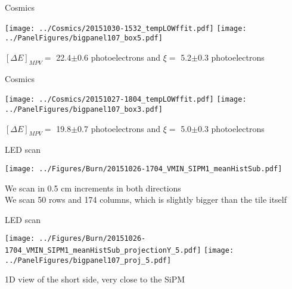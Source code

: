 \documentclass[compress,8pt]{beamer} %
\begin{document}
\begin{frame}{Cosmics}
\begin{adjustwidth}{-2em}{-2em}
\begin{center}
\texttt{[image: ../Cosmics/20151030-1532\_tempLOWffit.pdf]}
\texttt{[image: ../PanelFigures/bigpanel107\_box5.pdf]}
\end{center}
\end{adjustwidth}
$[\Delta E]_{MPV} =$ 22.4$\pm$0.6 photoelectrons and $\xi =$ 5.2$\pm$0.3 photoelectrons \\
\end{frame}

\begin{frame}{Cosmics}
\begin{adjustwidth}{-2em}{-2em}
\begin{center}
\texttt{[image: ../Cosmics/20151027-1804\_tempLOWffit.pdf]}
\texttt{[image: ../PanelFigures/bigpanel107\_box3.pdf]}
\end{center}
\end{adjustwidth}
$[\Delta E]_{MPV} =$ 19.8$\pm$0.7 photoelectrons and $\xi =$ 5.0$\pm$0.3 photoelectrons \\
\end{frame}





\begin{frame}{LED scan}
\begin{adjustwidth}{-3em}{-3em}
\begin{center}
\texttt{[image: ../Figures/Burn/20151026-1704\_VMIN\_SIPM1\_meanHistSub.pdf]}
\end{center}
\end{adjustwidth}
We scan in 0.5 cm increments in both directions \\
We scan 50 rows and 174 columns, which is slightly bigger than the tile itself
\end{frame}





\begin{frame}{LED scan}
\begin{adjustwidth}{-3em}{-3em}
\begin{center}
\texttt{[image: ../Figures/Burn/20151026-1704\_VMIN\_SIPM1\_meanHistSub\_projectionY\_5.pdf]}
\texttt{[image: ../PanelFigures/bigpanel107\_proj\_5.pdf]}
\end{center}
\end{adjustwidth}
1D view of the short side, very close to the SiPM
\end{frame}
\end{document}
